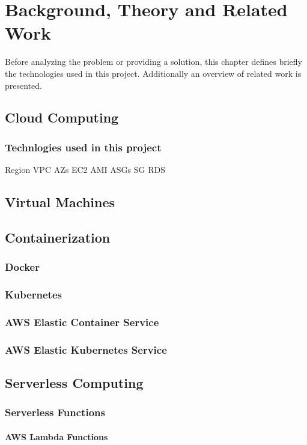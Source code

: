 \part{Background, Theory and Related Work}
\label{sec:background}

Before analyzing the problem or providing a solution,
this chapter defines briefly the technologies used in this project.
Additionally an overview of related work is presented.

\chapter{Cloud Computing}
\section{Technlogies used in this project}
Region
VPC
AZs
EC2
AMI
ASGs
SG
RDS

\chapter{Virtual Machines}

\chapter{Containerization}
\section{Docker}
\section{Kubernetes}
\section{AWS Elastic Container Service}
\section{AWS Elastic Kubernetes Service}

\chapter{Serverless Computing}
\section{Serverless Functions}
\subsection{AWS Lambda Functions}
